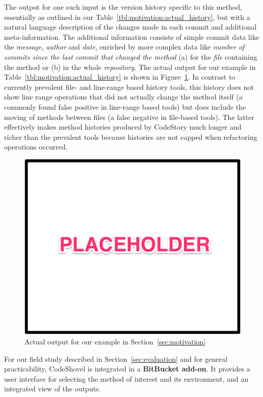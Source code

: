 The output for one such input is the version history specific to this method, essentially as outlined in our Table~\ref{tbl:motivation:actual_history}, but with a natural language description of the changes made in each commit and additional meta-information. The additional information consists of simple commit data like the \textit{message}, \textit{author} and \textit{date}, enriched by more complex data like \textit{number of commits since the last commit that changed the method} (a) for the \textit{file} containing the method or (b) in the whole \textit{repository}. The actual output for our example in Table~\ref{tbl:motivation:actual_history} is shown in Figure~\ref{fig:sample_output}. In contrast to currently prevalent file- and line-range based history tools, this history does not show line range operations that did not actually change the method itself (a commonly found false positive in line-range based tools) but does include the moving of methods between files (a false negative in file-based tools). The latter effectively makes method histories produced by CodeStory much longer and richer than the prevalent tools because histories are not capped when refactoring operations occurred.

\begin{figure}[t!]
  \includegraphics[width=0.98\columnwidth]{figures/sample_output}
  \caption{Actual output for our example in Section~\ref{sec:motivation}}
  \label{fig:sample_output}
\end{figure}

For our field study described in Section~\ref{sec:evaluation} and for general practicability, CodeShovel is integrated in a \textbf{BitBucket add-on}. It provides a user interface for selecting the method of interest and its environment, and an integrated view of the outputs.

